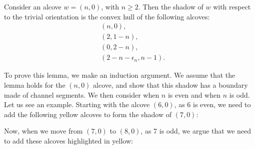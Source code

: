 \documentclass[11pt]{article}
\begin{document}
\begin{lemma} \label{convexlemma}
    Consider an alcove $w=(n,0)$, with $n\geq 2$. Then the shadow of $w$ with respect to the trivial orientation is the convex hull of the following alcoves:
    \begin{align}
    &(n,0),\\
    &(2,1-n),\\
    &(0,2-n),\\
    &(2-n-\epsilon_n,n-1).
    \end{align}

\end{lemma}

To prove this lemma, we make an induction argument. We assume that the lemma holds for the $(n,0)$ alcove, and show that this shadow has a boundary made of channel segments. We then consider when $n$ is even and when $n$ is odd. Let us see an example. Starting with the alcove $(6,0)$, as 6 is even, we need to add the following yellow alcoves to form the shadow of $(7,0)$:  

\begin{center}
\resizebox{0.3\textwidth}{!}{}
\end{center}
    

Now, when we move from $(7,0)$ to $(8,0)$, as 7 is odd, we argue that we need to add these alcoves highlighted in yellow:


\begin{center}
\resizebox{0.3\textwidth}{!}{}
\end{center}
\end{document}
